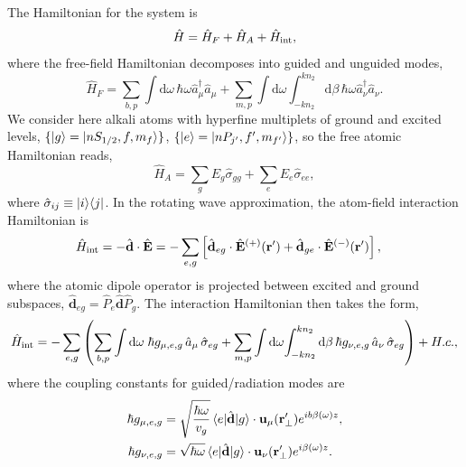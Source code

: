 \documentclass[preprint, aps,pra,onecolumn]{revtex4-1} %
\newcommand{\inter}{{\rm int}}
\begin{document}
The Hamiltonian for the system is
\begin{equation}
\hat{H} = \hat{H}_F+\hat{H}_A + \hat{H}_{\inter},
\end{equation}
where the free-field Hamiltonian decomposes into guided and unguided modes, 
	\begin{equation}
		\hat{H}_F = \sum_{b,p}\int \mathrm{d}\omega \, \hbar \omega \hat{a}^\dagger_\mu \hat{a}_\mu 
+\sum_{m,p} \int \mathrm{d}\omega  \int_{-k n_2}^{k n_2} \mathrm{d}\beta \, \hbar \omega 
\hat{a}^\dagger_\nu \hat{a}_\nu.
	\end{equation}
We consider here alkali atoms with hyperfine multiplets of ground and excited levels, $\{ \lvert{g}\rangle=\lvert{nS_{1/2}, f, m_f}\rangle\}$, $\{ \lvert{e}\rangle =\lvert{nP_{j'}, f', m_{f'}}\rangle\}$, so the free atomic Hamiltonian reads,
	\begin{equation}
		\hat{H}_A  = \sum_g E_g \hat{\sigma}_{gg} + \sum_e E_e \hat{\sigma}_{ee},
	\end{equation}
where $\hat{\sigma}_{ij} \equiv \lvert{i}\rangle\langle{j}\rvert$.  In the rotating wave approximation, the atom-field interaction Hamiltonian is
	\begin{align}
		\hat{H}_{\inter} &= -\hat{\mathbf{d}}\cdot \hat{\mathbf{E}} =- \sum_{e,g} \left[ \hat{\mathbf{d}}_{eg}\cdot 
\hat{\mathbf{E}}^{(+)}(\br')+\hat{\mathbf{d}}_{ge}\cdot \hat{\mathbf{E}}^{(-)}(\br') \right],
	\end{align}
where the atomic dipole operator is projected between excited and ground subspaces, $\hat{\mathbf{d}}_{eg}= \hat{P}_e \hat{\mathbf{d}} \hat{P}_g $. The interaction Hamiltonian then takes the form, 
\begin{equation}
	\hat{H}_{\inter} = -\sum_{e,g} \left(\sum_{b,p} \int\mathrm{d}\omega \; \hbar g_{\mu, e,g}\, \hat{a}_\mu  \, 
		\hat{\sigma}_{eg}+ \sum_{m,p} \int\mathrm{d}\omega \! \int_{-kn_2}^{kn_2}\mathrm{d}\beta \,  \hbar 
g_{\nu, e,g}\, \hat{a}_\nu \, \hat{\sigma}_{eg}\right) + {H.c.},
	\end{equation}
where the coupling constants for guided/radiation modes are
\begin{subequations} \label{Eq::CouplingConstants}
	\begin{align}
		\hbar g_{\mu, e,g} &= \sqrt{\frac{\hbar \omega}{ v_g  }}\, \langle{e}\rvert \hat{\mathbf{d}} \lvert{g}\rangle 
\cdot\mathbf{u}_\mu ( \mathbf{r}'_\perp ) e^{i b \beta(\omega)z} , \\
		\hbar g_{\nu, e,g} &= \sqrt{  \hbar \omega } \, \langle{e}\rvert \hat{\mathbf{d}} \lvert{g}\rangle \cdot \mathbf{u}_\nu ( \mathbf{r}'_\perp) e^{i\beta(\omega)z}  .
	\end{align}
\end{subequations}
\end{document}
